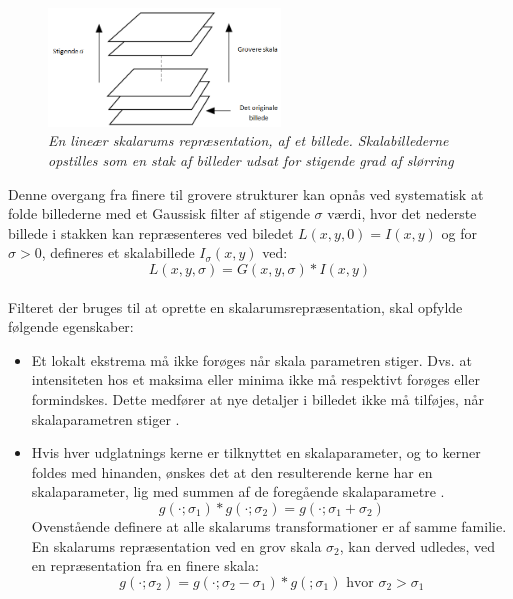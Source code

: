 \begin{figure}[H]
    \centering
    \includegraphics[width=0.55\textwidth]{fig/32.png}
     \vspace{-0.5em}
    \begin{center}    
       \caption{{\footnotesize \textit{En lineær skalarums repræsentation, af et billede. Skalabillederne opstilles som en stak af billeder udsat for stigende grad af slørring}}}
    \label{fig:scalerep}
     \end{center}
     \vspace{-2.5em}
  \end{figure} \noindent
Denne overgang fra finere til grovere strukturer kan opnås ved systematisk at folde billederne med et Gaussisk filter af stigende $\sigma$ værdi, hvor det nederste billede i stakken kan repræsenteres ved biledet $ L(x,y,0) = I(x,y)$ og for $\sigma>0$, defineres et skalabillede $I_\sigma(x,y)$ ved:
\begin{equation}
L(x,y,\sigma) = G(x,y,\sigma)\ast I(x,y)
\label{scalespace1}
\end{equation}
\\
Filteret der bruges til at oprette en skalarumsrepræsentation, skal opfylde følgende egenskaber:
\begin{itemize}
\item{Et lokalt ekstrema må ikke forøges når skala parametren stiger. Dvs. at intensiteten hos et maksima eller minima ikke må respektivt forøges eller formindskes. Dette medfører at nye detaljer i billedet ikke må tilføjes, når skalaparametren stiger \cite{lindkth}.}
\item{Hvis hver udglatnings kerne er tilknyttet en skalaparameter, og to kerner foldes med hinanden, ønskes det at den resulterende kerne har en skalaparameter, lig med summen af de foregående skalaparametre \cite{springer}.
\begin{equation}
g(\cdot;\sigma_1) \ast g(\cdot;\sigma_2)=g(\cdot;\sigma_1+\sigma_2)
\label{semi}
\end{equation}
Ovenstående definere at alle skalarums transformationer er af samme familie. En skalarums repræsentation ved en grov skala $\sigma_2$, kan derved udledes, ved en repræsentation fra en finere skala:
\begin{equation}
g(\cdot;\sigma_2) = g(\cdot;\sigma_2-\sigma_1)\ast g(;\sigma_1)\text{     hvor     }\sigma_2>\sigma_1
\end{equation}}
\end{itemize}
